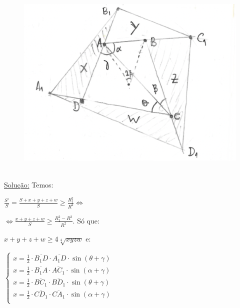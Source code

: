 \documentclass[a4paper,12pt]{article}
\renewcommand{\geq}{\ensuremath{\geqslant}}
\theoremstyle{plain} %
\theoremstyle{definition} %
\theoremstyle{remark} %
\begin{document}
	\begin{framed}
		\begin{figure}
			\includegraphics[width=0.9\linewidth]{1 page 15.png}
		\end{figure} \, \\
		
		\underline{Solu\c{c}\~ao:} Temos:
		
		
		
		$\displaystyle\frac{S'}{S}=\frac{S+x+y+z+w}{S}\geq \frac{R_1^2}{R^2}\Leftrightarrow$ 
		
		$\Leftrightarrow \displaystyle\frac{x+y+z+w}{S}\geq \frac{R_1^2-R^2}{R^2}$. S\'o que:
		
		\vspace{1em}
		$x+y+z+w\geq 4\sqrt[4]{xyzw}$ e:
		
		\vspace{4ex}
		\begin{multicols}{2}
			
			
			$ 
			\left\{
			\begin{aligned}
				x=\frac{1}{2}\cdot\overline{B_1D}\cdot \overline{A_1D}\cdot \sin(\theta+\gamma)\\
				x=\frac{1}{2}\cdot\overline{B_1A}\cdot \overline{AC_1}\cdot \sin(\alpha+\gamma)\\
				x=\frac{1}{2}\cdot\overline{BC_1}\cdot \overline{BD_1}\cdot \sin(\theta+\gamma)\\
				x=\frac{1}{2}\cdot\overline{CD_1}\cdot \overline{CA_1}\cdot \sin(\alpha+\gamma)\\
			\end{aligned}
			\right.
			$ 
			
			\columnbreak
			

\end{multicols}
\end{framed}
\end{document}
